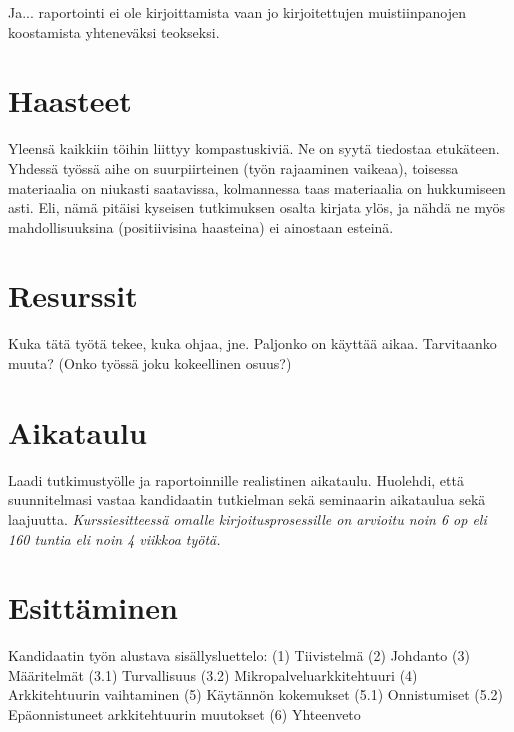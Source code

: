 \documentclass[12pt,a4paper,finnish,oneside]{article}
\begin{document}
Ja... raportointi ei ole kirjoittamista vaan jo kirjoitettujen
muistiinpanojen koostamista yhteneväksi teokseksi.

\section{Haasteet}

Yleensä kaikkiin töihin liittyy kompastuskiviä. Ne on syytä tiedostaa
etukäteen. Yhdessä työssä aihe on suurpiirteinen (työn rajaaminen
vaikeaa), toisessa materiaalia on niukasti saatavissa, kolmannessa
taas materiaalia on hukkumiseen asti.  Eli, nämä pitäisi kyseisen
tutkimuksen osalta kirjata ylös, ja nähdä ne myös mahdollisuuksina
(positiivisina haasteina) ei ainostaan esteinä.

\section{Resurssit}

Kuka tätä työtä tekee, kuka ohjaa, jne. Paljonko on käyttää
aikaa. Tarvitaanko muuta? (Onko työssä joku kokeellinen osuus?)

\section{Aikataulu}

Laadi tutkimustyölle ja raportoinnille realistinen aikataulu.
Huolehdi, että suunnitelmasi vastaa kandidaatin tutkielman sekä
seminaarin aikataulua sekä laajuutta.  \emph{Kurssiesitteessä omalle
  kirjoitusprosessille on arvioitu noin 6 op eli 160 tuntia eli noin 4
  viikkoa työtä.}



\section{Esittäminen}

Kandidaatin työn alustava sisällysluettelo:
(1) Tiivistelmä
(2) Johdanto
(3) Määritelmät
(3.1) Turvallisuus
(3.2) Mikropalveluarkkitehtuuri
(4) Arkkitehtuurin vaihtaminen 
(5) Käytännön kokemukset
(5.1) Onnistumiset
(5.2) Epäonnistuneet arkkitehtuurin muutokset 
(6) Yhteenveto
\end{document}
